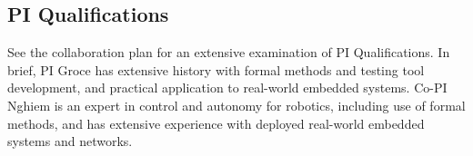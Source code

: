 \subsection{PI Qualifications}

See the collaboration plan for an extensive examination of PI Qualifications.  In brief, PI Groce has extensive history with formal methods and testing tool development, and practical application to real-world embedded systems.  Co-PI Nghiem is an expert in control and autonomy for robotics, including use of formal methods, and has extensive experience with deployed real-world embedded systems and networks.


